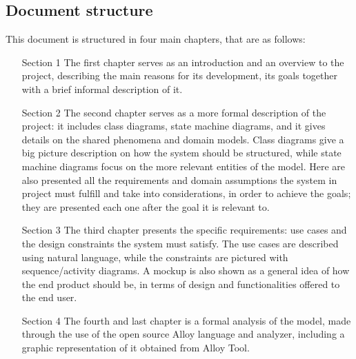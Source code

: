 \subsection{Document structure}
This document is structured in four main chapters, that are as follows:
\begin{enumerate}
	\item[Section 1] The first chapter serves as an introduction and an overview to the project, describing the main reasons for its development, its goals together with a brief informal description of it.

	\item[Section 2] The second chapter serves as a more formal description of the project: it includes class diagrams, state machine diagrams, and it gives details on the shared phenomena and domain models. Class diagrams give a big picture description on how the system should be structured, while state machine diagrams focus on the more relevant entities of the model. Here are also presented all the requirements and domain assumptions the system in project must fulfill and take into considerations, in order to achieve the goals; they are presented each one after the goal it is relevant to.

	\item[Section 3] The third chapter presents the specific requirements: use cases and the design constraints the system must satisfy. The use cases are described using natural language, while the constraints are pictured with sequence/activity diagrams. A mockup is also shown as a general idea of how the end product should be, in terms of design and functionalities offered to the end user.

	\item[Section 4] The fourth and last chapter is a formal analysis of the model, made through the use of the open source Alloy language and analyzer, including a graphic representation of it obtained from Alloy Tool.
\end{enumerate}
